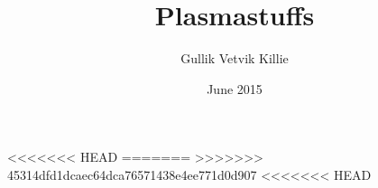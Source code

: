 \documentclass[x11names,twoside,english]{uiofysmaster}
\author{Gullik Vetvik Killie}
\title{Plasmastuffs}
\date{June 2015}
\begin{document}
% 
%
\tableofcontents
% 
%     

%     

%     
%     
%     
%     
%     
%     
%     
%     
%     
%     
<<<<<<< HEAD
% 	
=======
% 	
>>>>>>> 45314dfd1dcaec64dca76571438e4ee771d0d907
%     
%     
%     
%     
%     
<<<<<<< HEAD
%
%     
%     
%     
%     
\end{document}
